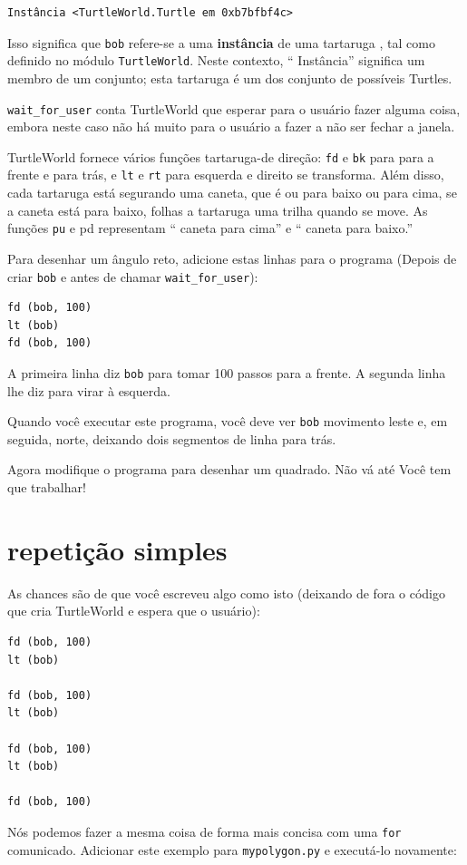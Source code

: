 \documentclass[10pt]{book}
\begin{document}
\begin{verbatim}
Instância <TurtleWorld.Turtle em 0xb7bfbf4c>
\end{verbatim}
%
Isso significa que {\tt bob} refere-se a
uma {\bf instância} de uma tartaruga
, tal como definido no módulo {\tt TurtleWorld}. Neste contexto,
`` Instância'' significa um membro de um conjunto;
esta tartaruga é um dos conjunto de possíveis Turtles.

\Verb "wait_for_user" conta TurtleWorld que esperar para o usuário
fazer alguma coisa, embora neste caso não há muito para
o usuário a fazer a não ser fechar a janela.

TurtleWorld fornece vários
funções tartaruga-de direção: {\tt fd} e {\tt bk} para
para a frente e para trás, e {\tt lt} e {\tt rt} para esquerda e
direito se transforma. Além disso, cada tartaruga está segurando uma caneta, que é
ou para baixo ou para cima, se a caneta está para baixo, folhas a tartaruga
uma trilha quando se move. As funções {\tt pu} e {pd \tt}
representam `` caneta para cima'' e `` caneta para baixo.''

Para desenhar um ângulo reto, adicione estas linhas para o programa
(Depois de criar {\tt bob} e antes de chamar \verb "wait_for_user"):

\begin{verbatim}
fd (bob, 100)
lt (bob)
fd (bob, 100)
\end{verbatim}
%
A primeira linha diz {\tt bob} para tomar 100 passos
para a frente. A segunda linha lhe diz para virar à esquerda.

Quando você executar este programa, você deve ver {\tt bob} movimento leste e, em seguida,
norte, deixando dois segmentos de linha para trás.

Agora modifique o programa para desenhar um quadrado. Não vá até
Você tem que trabalhar!


\section{repetição simples}
\label{repetição}

As chances são de que você escreveu algo como isto (deixando de fora o código
que cria TurtleWorld e espera que o usuário):

\begin{verbatim}
fd (bob, 100)
lt (bob)

fd (bob, 100)
lt (bob)

fd (bob, 100)
lt (bob)

fd (bob, 100)
\end{verbatim}
%
Nós podemos fazer a mesma coisa de forma mais concisa com uma {\tt for} comunicado.
Adicionar este exemplo para {\tt mypolygon.py} e executá-lo novamente:
\end{document}
